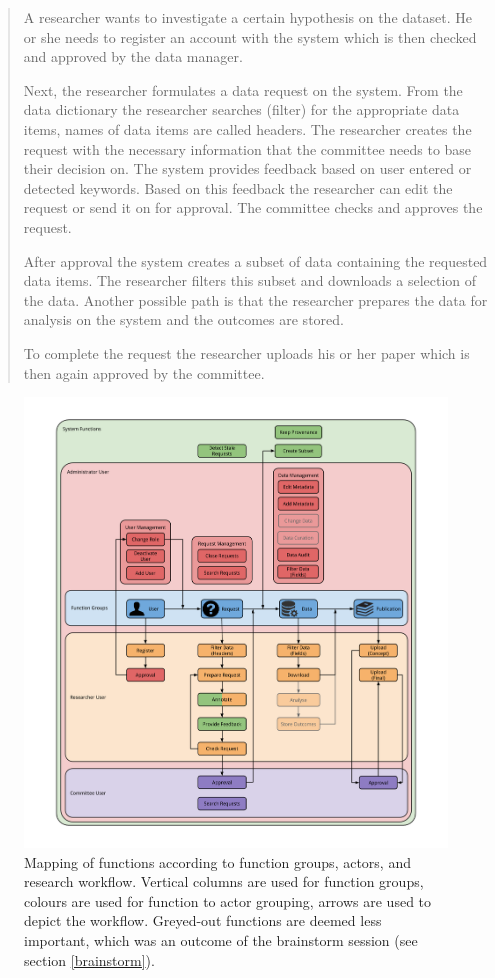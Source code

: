 \begin{quotation}
	\noindent A researcher wants to investigate a certain hypothesis on the \project{} dataset.
	He or she needs to register an account with the system which is then checked and approved by the data manager.
	
	Next, the researcher formulates a data request on the system.
	From the data dictionary the researcher searches (filter) for the appropriate data items, names of data items are called headers.
	The researcher creates the request with the necessary information that the committee needs to base their decision on.
	The system provides feedback based on user entered or detected keywords.
	Based on this feedback the researcher can edit the request or send it on for approval.
	The committee checks and approves the request.
	
	After approval the system creates a subset of \project{} data containing the requested data items.
	The researcher filters this subset and downloads a selection of the data.
	Another possible path is that the researcher prepares the data for analysis on the system and the outcomes are stored.
	
	To complete the request the researcher uploads his or her paper which is then again approved by the committee.
\end{quotation}

\begin{figure}[!htb]
	\centering
	\includegraphics[width=1.0\linewidth]{images/functions-in-workflow}
	\caption{
		Mapping of functions according to function groups, actors, and research workflow.
		Vertical columns are used for function groups, colours are used for function to actor grouping, arrows are used to depict the workflow.
		Greyed-out functions are deemed less important, which was an outcome of the brainstorm session (see section \ref{brainstorm}).
	}
	\label{fig:functions-workflow}
\end{figure}